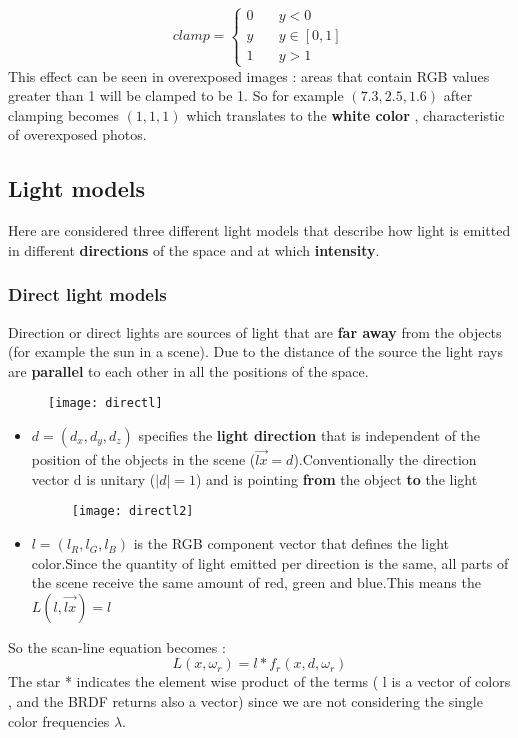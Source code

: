 \[ clamp =
  \begin{cases}
    0       & \quad y<0\\
    y  & \quad y \in [0,1]\\
    1  & \quad y >1
  \end{cases}
\]
This effect can be seen in overexposed images : areas that contain RGB values greater than 1 will be clamped to be 1. So for example $(7.3,2.5,1.6)$ after clamping becomes $(1,1,1)$ which translates to the \textbf{white color} , characteristic of overexposed photos.

\subsection{Light models}
Here are considered three different light models that describe how light is emitted in different \textbf{directions} of the space and at which \textbf{intensity}. 

\subsubsection{Direct light models}
Direction or direct lights are sources of light that are \textbf{far away} from the objects (for example the sun in a scene). Due to the distance of the source the light rays are \textbf{parallel} to each other in all the positions of the space.
\begin{figure}[H]
  \centering
  \texttt{[image: directl]}
\end{figure}
\begin{itemize}
\item $d=(d_x,d_y,d_z)$ specifies the \textbf{light direction} that is independent of the position of the objects in the scene ($ \vec{lx} = d$).Conventionally the direction vector d is unitary ($|d|=1$) and is pointing \textbf{from } the object \textbf{to} the light
\begin{figure}[H]
  \centering
  \texttt{[image: directl2]}
\end{figure}
\item $l=(l_R,l_G,l_B)$ is the RGB component vector that defines the light color.Since the quantity of light emitted per direction is the same, all parts of the scene receive the same amount of red, green and blue.This means the $L(l,\vec{lx}) = l$
\end{itemize}
So the scan-line equation becomes :
\[
\boxed{L(x,\omega_r)= l * f_r(x,d,\omega_r)}
\]
The star * indicates the element wise product of the terms ( l is a vector of colors , and the BRDF returns also a vector) since we are not considering the single color frequencies $\lambda$.

